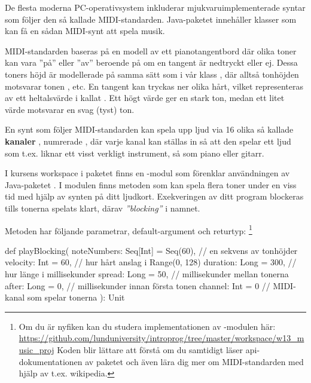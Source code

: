 {De flesta moderna PC-operativsystem inkluderar mjukvaruimplementerade syntar som följer den så kallade MIDI-standarden. Java-paketet  innehåller klasser som kan få en sådan MIDI-synt att spela musik.

MIDI-standarden baseras på en modell av ett pianotangentbord där olika toner kan vara ''på'' eller ''av'' beroende på om en tangent är nedtryckt eller ej. Dessa toners höjd är modellerade på samma sätt som i vår klass , där alltså tonhöjden  motsvarar tonen , etc. En tangent kan tryckas ner olika hårt, vilket representeras av ett heltalsvärde i  kallat . Ett högt värde ger en stark ton, medan ett litet värde motsvarar en svag (tyst) ton.

En synt som följer MIDI-standarden kan spela upp ljud via 16 olika så kallade \textbf{kanaler} , numrerade ,  där varje kanal kan ställas in så att den spelar ett ljud som t.ex. liknar ett visst verkligt instrument, så som piano eller gitarr.

I kursens workspace i paketet  finns en -modul som förenklar användningen av Java-paketet . I modulen  finns metoden  som kan spela flera toner under en viss tid med hjälp av synten på ditt ljudkort. Exekveringen av ditt program  blockeras tills tonerna spelats klart, därav \emph{''blocking''} i namnet.

Metoden  har följande parametrar, default-argument och returtyp:
\footnote{Om du är nyfiken kan du studera implementationen av -modulen här:
\\\url{https://github.com/lunduniversity/introprog/tree/master/workspace/w13_music_proj}
 Koden blir lättare att förstå om du samtidigt läser api-dokumentationen av paketet  och även lära dig mer om MIDI-standarden med hjälp av t.ex. wikipedia.}

\begin{Code}
def playBlocking(
  noteNumbers: Seq[Int] = Seq(60), // en sekvens av tonhöjder
  velocity: Int         = 60,      // hur hårt anslag i Range(0, 128)
  duration: Long        = 300,     // hur länge i millisekunder
  spread:   Long        = 50,      // millisekunder mellan tonerna
  after:    Long        = 0,       // millisekunder innan första tonen
  channel:  Int         = 0        // MIDI-kanal som spelar tonerna
): Unit
\end{Code}


}
